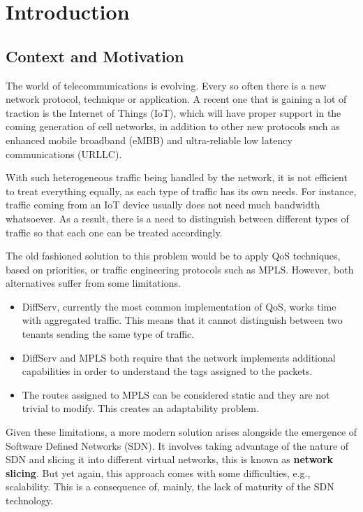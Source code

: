 \chapter{Introduction} \label{chapter:introduction}

\section{Context and Motivation}
The world of telecommunications is evolving. Every so often there is a new network protocol, technique or application. A recent one that is gaining a lot of traction is the Internet of Things (IoT), which will have proper support in the coming generation of cell networks, in addition to other new protocols such as enhanced mobile broadband (eMBB) and ultra-reliable low latency communications (URLLC).

With such heterogeneous traffic being handled by the network, it is not efficient to treat everything equally, as each type of traffic has its own needs. For instance, traffic coming from an IoT device usually does not need much bandwidth whatsoever. As a result, there is a need to distinguish between different types of traffic so that each one can be treated accordingly.  

The old fashioned solution to this problem would be to apply QoS techniques, based on priorities, or traffic engineering protocols such as MPLS. However, both alternatives suffer from some limitations.
\begin{itemize}
    \item DiffServ, currently the most common implementation of QoS, works time with aggregated traffic. This means that it cannot distinguish between two tenants sending the same type of traffic.
    \item DiffServ and MPLS both require that the network implements additional capabilities in order to understand the tags assigned to the packets.
    \item The routes assigned to MPLS can be considered static and they are not trivial to modify. This creates an adaptability problem.
\end{itemize}

Given these limitations, a more modern solution arises alongside the emergence of Software Defined Networks (SDN). It involves taking advantage of the nature of SDN and slicing it into different virtual networks, this is known as \textbf{network slicing}. But yet again, this approach comes with some difficulties, e.g., scalability. This is a consequence of, mainly, the lack of maturity of the SDN technology. 

